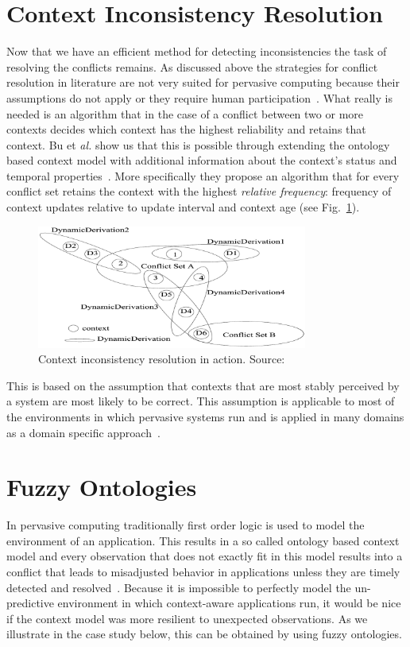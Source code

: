 \documentclass[journal]{vgtc}                %
\begin{document}
\section{Context Inconsistency Resolution}
Now that we have an efficient method for detecting inconsistencies the task of resolving the conflicts remains. As discussed above the strategies for conflict resolution in literature are not very suited for pervasive computing because their assumptions do not apply or they require human participation~\cite{xu:2010:PCC}. What really is needed is an algorithm that in the case of a conflict between two or more contexts decides which context has the highest reliability and retains that context. Bu et \textit{al.} show us that this is possible through extending the ontology based context model with additional information about the context's status and temporal properties~\cite{bu:2006:CCM}. More specifically they propose an algorithm that for every conflict set retains the context with the highest \textit{relative frequency}: frequency of context updates relative to update interval and context age (see Fig.~\ref{fig:cir}). 
\begin{figure}[htb]
  \centering
  \includegraphics[width=3.5in]{cir}
  \caption{Context inconsistency resolution in action. Source:~\cite{bu:2006:CCM}}
  \label{fig:cir}
\end{figure}
This is based on the assumption that contexts that are most stably perceived by a system are most likely to be correct. This assumption is applicable to most of the environments in which pervasive systems run and is applied in many domains as a domain specific approach~\cite{xu:2010:PCC}.

\section{Fuzzy Ontologies}
In pervasive computing traditionally first order logic is used to model the environment of an application. This results in a so called ontology based context model and every observation that does not exactly fit in this model results into a conflict that leads to misadjusted behavior in applications unless they are timely detected and resolved~\cite{xu:2010:PCC}. Because it is impossible to perfectly model the un-predictive environment in which context-aware applications run, it would be nice if the context model was more resilient to unexpected observations. As we illustrate in the case study below, this can be obtained by using fuzzy ontologies.
\end{document}
